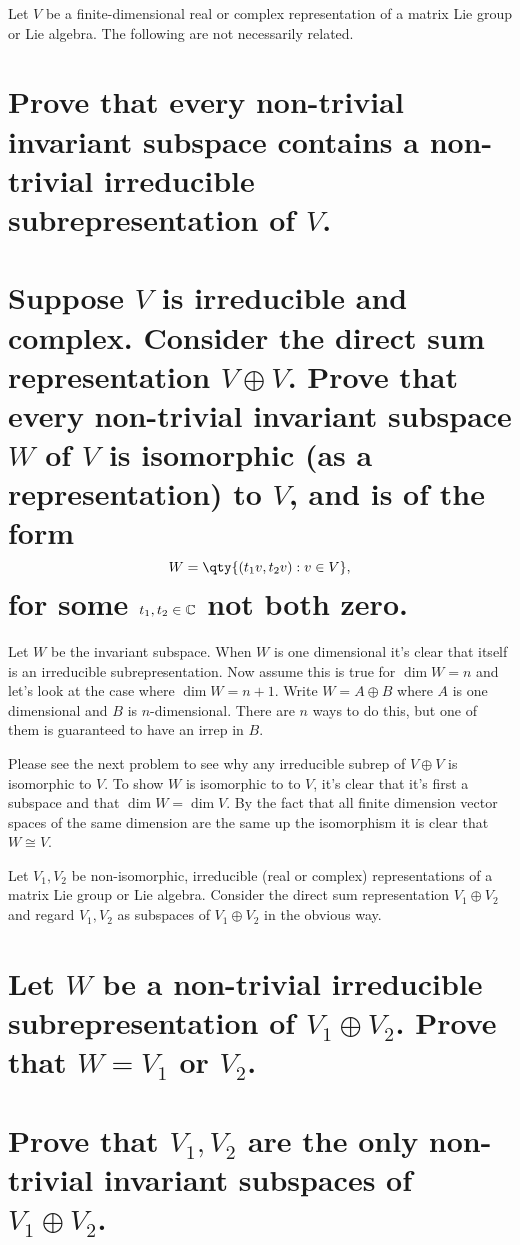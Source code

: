 \documentclass[
	pages,
	boxes,
	color=WildStrawberry
]{homework}
\begin{document}
\begin{problem}
Let $V$ be a finite-dimensional real or complex representation of a matrix Lie group or Lie algebra. The following are not necessarily related.
\begin{parts}
	\part{Prove that every non-trivial invariant subspace contains a non-trivial irreducible subrepresentation of $V$.}\label{part:5a}
	\part{Suppose $V$ is irreducible and complex. Consider the direct sum representation $V \oplus V$. Prove that every non-trivial invariant subspace $W$ of $V$ is isomorphic (as a representation) to $V$, and is of the form
		\[
			W = \qty{(t_1v, t_2v) : v \in V},
		\]
		for some $t_1, t_2 \in \mathbb{C}$ not both zero.}\label{part:5b}
\end{parts}
\end{problem}

\begin{solution}
	\ref{part:5a}
	Let $W$ be the invariant subspace. When $W$ is one dimensional it's clear that itself is an irreducible subrepresentation. Now assume this is true for $\dim W = n$ and let's look at the case where $\dim W = n + 1$. Write $W = A\oplus B$ where $A$ is one dimensional and $B$ is $n$-dimensional. There are $n$ ways to do this, but one of them is guaranteed to have an irrep in $B$.

	\ref{part:5b}
	Please see the next problem to see why any irreducible subrep of $V\oplus V$ is isomorphic to $V$. To show $W$ is isomorphic to to $V$, it's clear that it's first a subspace and that $\dim W = \dim V$. By the fact that all finite dimension vector spaces of the same dimension are the same up the isomorphism it is clear that $W\cong V$.
\end{solution}

\begin{problem}
Let $V_1, V_2$ be non-isomorphic, irreducible (real or complex) representations of a matrix Lie group or Lie algebra. Consider the direct sum representation $V_1 \oplus V_2$ and regard $V_1, V_2$ as subspaces of $V_1 \oplus V_2$ in the obvious way.
\begin{parts}
	\part{Let $W$ be a non-trivial irreducible subrepresentation of $V_1 \oplus V_2$. Prove that $W = V_1$ or $V_2$.}
	\part{Prove that $V_1, V_2$ are the only non-trivial invariant subspaces of $V_1 \oplus V_2$.}
\end{parts}
\end{problem}
\end{document}
